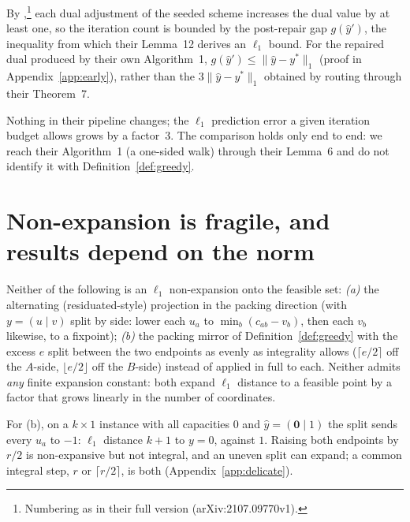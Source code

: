 \begin{corollary}[Constant $3 \to 1$]\label{cor:dinitz}
By \citet[Prop.~9 and Lemma~11]{dinitz2021},\footnote{Numbering as in their full version (arXiv:2107.09770v1).} each dual adjustment of the seeded scheme
increases the dual value by at least one, so the iteration count is bounded by the post-repair gap
$g(\hat{y}')$, the inequality from which their Lemma~12 derives an $\ell_1$ bound. For
the repaired dual produced by their own Algorithm~1, $g(\hat{y}') \le \|\hat{y} - y^*\|_1$ (proof
in Appendix~\ref{app:early}), rather than the $3\|\hat{y} - y^*\|_1$ obtained by routing through
their Theorem~7.
\end{corollary}

Nothing in their pipeline changes; the $\ell_1$ prediction error a given iteration budget allows
grows by a factor~$3$. The comparison holds only end to end: we reach their
Algorithm~1 (a one-sided walk) through their Lemma~6 and do not identify it with
Definition~\ref{def:greedy}.

\section{Non-expansion is fragile, and results depend on the norm}\label{sec:delicate}

\begin{proposition}\label{prop:fail}
Neither of the following is an $\ell_1$ non-expansion onto the feasible set:
\emph{(a)} the alternating (residuated-style) projection in the packing direction (with $y = (u \mid v)$ split by side: lower each
$u_a$ to $\min_b(c_{ab} - v_b)$, then each $v_b$ likewise, to a fixpoint);
\emph{(b)} the packing mirror of Definition~\ref{def:greedy} with the excess $e$ split between the
two endpoints as evenly as integrality allows ($\lceil e/2 \rceil$ off the $A$-side,
$\lfloor e/2 \rfloor$ off the $B$-side) instead of applied in full to each.
Neither admits \emph{any} finite expansion constant: both expand $\ell_1$ distance to a feasible
point by a factor that grows linearly in the number of coordinates.
\end{proposition}

For (b), on a $k \times 1$ instance with all capacities $0$ and $\hat y = (\mathbf 0 \mid 1)$ the split
sends every $u_a$ to $-1$: $\ell_1$ distance $k+1$ to $y = 0$, against $1$. Raising both endpoints
by $r/2$ is non-expansive but not integral, and an uneven split can expand; a common integral
step, $r$ or $\lceil r/2 \rceil$, is both (Appendix~\ref{app:delicate}).

